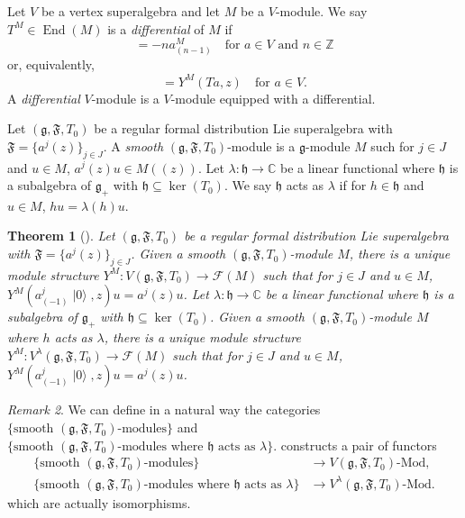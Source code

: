 \documentclass[a4paper, 12pt, reqno]{amsart}
\newtheorem{theorem}{Theorem}[section]
\theoremstyle{remark}
\newtheorem{remark}[theorem]{Remark}
\numberwithin{equation}{subsection}
\DeclareMathOperator{\End}{End}
\DeclareMathOperator{\vac}{|0\rangle}
\begin{document}
Let $V$ be a vertex superalgebra and let $M$ be a $V$-module.
We say  $T^M \in \End(M)$ is a \emph{differential} of $M$ if
\begin{equation*}
  [T^M, a^M_{(n)}] = -na^M_{(n - 1)} \quad \text{for }a \in V\text{ and }n \in \mathbb{Z}
\end{equation*}
or, equivalently,
\begin{equation*}
  [T^M, Y^M(a, z)] = Y^M(Ta, z) \quad \text{for }a \in V.
\end{equation*}
A \emph{differential} $V$-module is a $V$-module equipped with a differential.

Let $(\mathfrak{g}, \mathfrak{F}, T_0)$ be a regular formal distribution Lie superalgebra with $\mathfrak{F} = \{a^j(z)\}_{j \in J}$.
A \emph{smooth} $(\mathfrak{g}, \mathfrak{F}, T_0)$-module is a $\mathfrak{g}$-module $M$ such for $j \in J$ and $u \in M$, $a^j(z)u \in M((z))$.
Let $\lambda: \mathfrak{h} \to \mathbb{C}$ be a linear functional where $\mathfrak{h}$ is a subalgebra of $\mathfrak{g}_+$ with $\mathfrak{h} \subseteq \ker(T_0)$.
We say $\mathfrak{h}$ acts as $\lambda$ if for $h \in \mathfrak{h}$ and $u \in M$, $hu = \lambda(h)u$.

\begin{theorem}[{\cite[Theorem 2.15]{li_vertex_2004}}]
  \label{thr:25}
  Let $(\mathfrak{g}, \mathfrak{F}, T_0)$ be a regular formal distribution Lie superalgebra with $\mathfrak{F} = \{a^j(z)\}_{j \in J}$.
  Given a smooth $(\mathfrak{g}, \mathfrak{F}, T_0)$-module $M$, there is a unique module structure $Y^M: V(\mathfrak{g}, \mathfrak{F}, T_0) \to \mathcal{F}(M)$ such that for $j \in J$ and $u \in M$, $Y^M(a^j_{(-1)}\vac, z)u = a^j(z)u$.
  Let $\lambda: \mathfrak{h} \to \mathbb{C}$ be a linear functional where $\mathfrak{h}$ is a subalgebra of $\mathfrak{g}_+$ with $\mathfrak{h} \subseteq \ker(T_0)$.
  Given a smooth $(\mathfrak{g}, \mathfrak{F}, T_0)$-module $M$ where $h$ acts as $\lambda$, there is a unique module structure $Y^M: V^{\lambda}(\mathfrak{g}, \mathfrak{F}, T_0) \to \mathcal{F}(M)$ such that for $j \in J$ and $u \in M$, $Y^M(a^j_{(-1)}\vac, z)u = a^j(z)u$.
\end{theorem}

\begin{remark}
  \label{rmk:23}
  We can define in a natural way the categories $\{\text{smooth }(\mathfrak{g}, \mathfrak{F}, T_0)\text{-modules}\}$ and $\{\text{smooth }(\mathfrak{g}, \mathfrak{F}, T_0)\text{-modules where }\mathfrak{h}\text{ acts as }\lambda\}$.
   constructs a pair of functors
  \begin{align*}
    \{\text{smooth }(\mathfrak{g}, \mathfrak{F}, T_0)\text{-modules}\} &\to V(\mathfrak{g}, \mathfrak{F}, T_0)\text{-Mod}, \\
    \{\text{smooth }(\mathfrak{g}, \mathfrak{F}, T_0)\text{-modules where }\mathfrak{h}\text{ acts as }\lambda\} &\to V^{\lambda}(\mathfrak{g}, \mathfrak{F}, T_0)\text{-Mod}.
  \end{align*}
  which are actually isomorphisms.
\end{remark}
\end{document}
